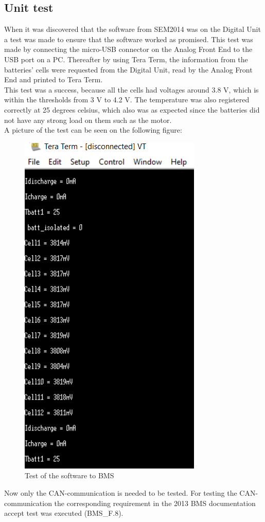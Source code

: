 \subsection{Unit test}
When it was discovered that the software from SEM2014 was on the Digital Unit a test was made to ensure that the software worked as promised. This test was made by connecting the micro-USB connector on the Analog Front End to the USB port on a PC. Thereafter by using Tera Term, the information from the batteries' cells were requested from the Digital Unit, read by the Analog Front End and printed to Tera Term.\\ 
This test was a success, because all the cells had voltages around 3.8 V, which is within the thresholds from 3 V to 4.2 V. The temperature was also registered correctly at 25 degrees celsius, which also was as expected since the batteries did not have any strong load on them such as the motor.\\
A picture of the test can be seen on the following figure:\\
\begin{figure}[H]
	\centering
	\includegraphics[width=0.5\linewidth]{Software/BMS_teraterm_test.PNG}
	\caption{Test of the software to BMS}
	\label{fig:SoftwareTest_teraterm_BMS}
\end{figure}

Now only the CAN-communication is needed to be tested. For testing the CAN-communication the corresponding requirement in the 2013 BMS documentation accept test was executed (BMS\_F.8).\\

